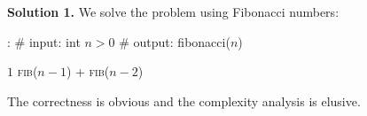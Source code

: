 \documentclass[12pt]{article}
\newenvironment{pseudocode}
{
  \mdframed
  \algorithmic[1]
}
{
  \endalgorithmic
  \endmdframed
}
\newcommand{\solution}[1]{\noindent \textbf{Solution #1.}}
\begin{document}
\solution{1}  We solve the problem using Fibonacci numbers:

\begin{pseudocode}
    :
    \State \# input: int $n > 0$
    \State \# output: fibonacci($n$)

        \State \Return $1$
    \Else
        \State \Return \textsc{fib}($n-1$) + \textsc{fib}($n-2$)
    \EndIf
    \EndFunction
\end{pseudocode}

The correctness is obvious and the complexity analysis is elusive.
\end{document}
